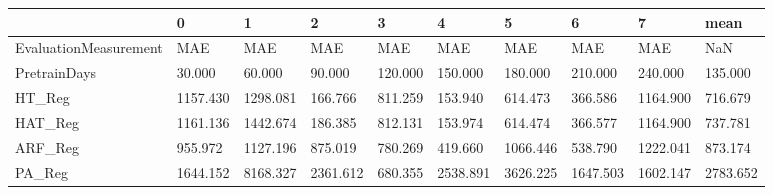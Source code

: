 \begin{tabular}{llllllllll}
\toprule
{} &        0 &        1 &        2 &       3 &        4 &        5 &        6 &        7 &     mean \\
\midrule
EvaluationMeasurement &      MAE &      MAE &      MAE &     MAE &      MAE &      MAE &      MAE &      MAE &      NaN \\
PretrainDays          &   30.000 &   60.000 &   90.000 & 120.000 &  150.000 &  180.000 &  210.000 &  240.000 &  135.000 \\
HT\_Reg                & 1157.430 & 1298.081 &  166.766 & 811.259 &  153.940 &  614.473 &  366.586 & 1164.900 &  716.679 \\
HAT\_Reg               & 1161.136 & 1442.674 &  186.385 & 812.131 &  153.974 &  614.474 &  366.577 & 1164.900 &  737.781 \\
ARF\_Reg               &  955.972 & 1127.196 &  875.019 & 780.269 &  419.660 & 1066.446 &  538.790 & 1222.041 &  873.174 \\
PA\_Reg                & 1644.152 & 8168.327 & 2361.612 & 680.355 & 2538.891 & 3626.225 & 1647.503 & 1602.147 & 2783.652 \\
\bottomrule
\end{tabular}
